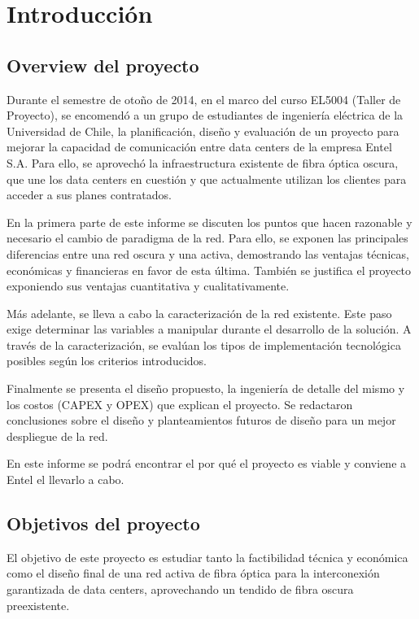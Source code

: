 
\section{Introducci\'on}
\label{sec:intro}

\subsection{Overview del proyecto}
\label{sec:overview}

Durante el semestre de otoño de 2014, en el marco del curso EL5004
(Taller de Proyecto), se encomendó a un grupo de estudiantes de
ingeniería eléctrica de la Universidad de Chile, la planificación,
diseño y evaluación de un proyecto para mejorar la capacidad de
comunicación entre data centers de la empresa Entel S.A. Para ello,
se aprovechó la infraestructura existente de fibra óptica oscura,
que une los data centers en cuestión y que actualmente utilizan los
clientes para acceder a sus planes contratados.

En la primera parte de este informe se discuten los puntos que hacen
razonable y necesario el cambio de paradigma de la red. Para ello, se
exponen las principales diferencias entre una red oscura y una activa,
demostrando las ventajas técnicas, económicas y financieras en favor
de esta última. También se justifica el proyecto exponiendo sus
ventajas cuantitativa y cualitativamente.

Más adelante, se lleva a cabo la caracterización de la red existente.
Este paso exige determinar las variables a manipular durante el 
desarrollo de la solución. A través de la caracterización, se 
evalúan los tipos de implementación tecnológica posibles según los 
criterios introducidos.

Finalmente se presenta el diseño propuesto, la ingeniería de detalle
del mismo y los costos (CAPEX y OPEX) que explican el proyecto. Se
redactaron conclusiones sobre el diseño y planteamientos futuros de
diseño para un mejor despliegue de la red.

En este informe se podrá encontrar el por qué el proyecto es viable y
conviene a Entel el llevarlo a cabo.

\subsection{Objetivos del proyecto}
\label{sec:objetivos}

El objetivo de este proyecto es estudiar tanto la factibilidad técnica
y económica como el diseño final de una red activa de fibra óptica
para la interconexión garantizada de data centers, aprovechando un
tendido de fibra oscura preexistente.

